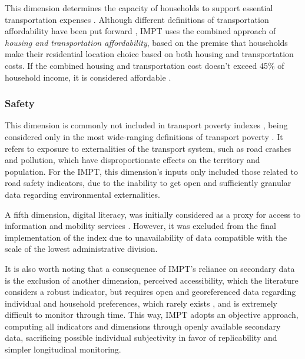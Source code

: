 \documentclass[
  authoryear,
  review,
  1p]{elsarticle}
\begin{document}
This dimension determines the capacity of households to support
essential transportation expenses \citep{Isalou_2014}
\citep{Litman_2026} \citep{Oviedo_2025}. Although different definitions
of transportation affordability have been put forward \citep{Lucas_2016}
\citep{AlonsoEpelde_2023}, IMPT uses the combined approach of
\emph{housing and transportation affordability}, based on the premise
that households make their residential location choice based on both
housing and transportation costs. If the combined housing and
transportation cost doesn't exceed 45\% of household income, it is
considered affordable \citep{Isalou_2014} \citep{Litman_2026}.

\subsubsection{Safety}\label{sec-LR_safety}

This dimension is commonly not included in transport poverty indexes
\citep{Kelly_2023}, being considered only in the most wide-ranging
definitions of transport poverty \citep{Lucas_2016}
\citep{UNHabitat_2013}. It refers to exposure to externalities of the
transport system, such as road crashes and pollution, which have
disproportionate effects on the territory and population. For the IMPT,
this dimension's inputs only included those related to road safety
indicators, due to the inability to get open and sufficiently granular
data regarding environmental externalities.

A fifth dimension, digital literacy, was initially considered as a proxy
for access to information and mobility services \citep{Durand_2022}
\citep{OrozcoFontalvo_2025} \citep{Velaga_2012}. However, it was
excluded from the final implementation of the index due to
unavailability of data compatible with the scale of the lowest
administrative division.

It is also worth noting that a consequence of IMPT's reliance on
secondary data is the exclusion of another dimension, perceived
accessibility, which the literature considers a robust indicator, but
requires open and georeferenced data regarding individual and household
preferences, which rarely exists \citep{Farber2025}, and is extremely
difficult to monitor through time. This way, IMPT adopts an objective
approach, computing all indicators and dimensions through openly
available secondary data, sacrificing possible individual subjectivity
in favor of replicability and simpler longitudinal monitoring.
\end{document}
